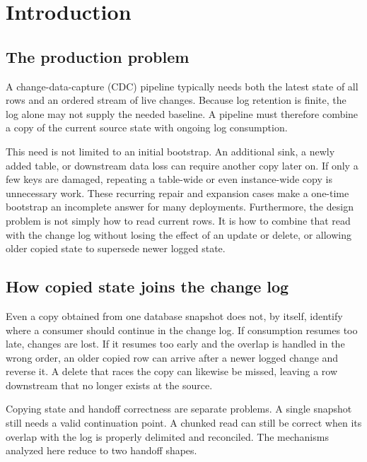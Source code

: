 \documentclass[sigconf,nonacm,10pt]{acmart}
\theoremstyle{plain}
\theoremstyle{definition}
\begin{document}
\maketitle

\newpage

\section{Introduction}\label{sec:intro}

\subsection{The production problem}

A change-data-capture (CDC) pipeline typically needs both the latest state
of all rows and an ordered stream of live changes. Because log
retention is finite, the log alone may not supply the needed baseline.
A pipeline must therefore combine a copy of the current source state with
ongoing log consumption.

This need is not limited to an initial bootstrap. An additional sink, a newly added
table, or downstream data loss can require another copy later on. If
only a few keys are damaged, repeating a table-wide or even instance-wide copy
is unnecessary work. These recurring repair and expansion cases make a
one-time bootstrap an incomplete answer for many deployments. Furthermore, the
design problem is not simply how to read current rows. It is how to
combine that read with the change log without losing the effect of an update
or delete, or allowing older copied state to supersede newer logged
state.

\subsection{How copied state joins the change log}

Even a copy obtained from one database snapshot does not,
by itself, identify where a consumer should continue in the change
log. If consumption resumes too late, changes are lost. If it resumes too
early and the overlap is handled in the wrong order, an older copied row can
arrive after a newer logged change and reverse it. A delete that races the
copy can likewise be missed, leaving a row downstream that no longer exists
at the source.

Copying state and handoff correctness are separate
problems. A single snapshot still needs a valid continuation
point. A chunked read can still be correct when its overlap with the log is
properly delimited and reconciled. The mechanisms analyzed here reduce
to two handoff shapes.
\end{document}
